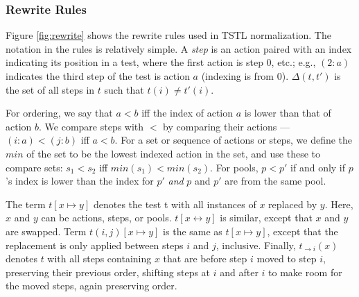 \subsubsection{Rewrite Rules}

Figure \ref{fig:rewrite} shows the rewrite rules used in TSTL normalization.
The notation in the rules is relatively simple.
A \emph{step} is an action paired with an index indicating its
position in a test,
where the first action is step 0, etc.; e.g., $(2: a)$ indicates the
third step of the test is action $a$ (indexing is from 0). 
$\Delta(t,t')$ is the set of all steps in $t$ such that $t(i) \not= t'(i)$.

For ordering, we say that
$a < b$ iff the index of action $a$ is lower
than that of action $b$.  We compare steps with $<$ by comparing their
actions --- $(i: a) < (j: b)$ iff $a < b$.  For a set or sequence of actions or steps, we define the $min$ of the
set to be the lowest indexed action in the set, and use
these to compare sets:  $s_1 < s_2$ iff $min(s_1) < min(s_2)$. For pools,
$p < p'$ if and only if $p$'s index is lower than the index for $p'$
\emph{and} $p$ and $p'$ are from the same pool.

The term $t[x \mapsto y]$ denotes the test t with all instances of $x$
replaced by $y$.  Here, $x$ and $y$ can be actions, steps, or pools.
$t[x \leftrightarrow y]$ is similar, except that $x$ and $y$ are
swapped.  Term $t(i,j)[x \mapsto y]$ is the same as $t[x \mapsto
y]$, except that the replacement is only applied between steps $i$ and
$j$, inclusive.  Finally, $t_{\rightarrow i}(x)$ denotes $t$ with all steps
containing $x$ that are before step $i$ moved to step $i$, preserving
their previous order, shifting steps at $i$ and after $i$ to make room for
the moved steps, again preserving order.


